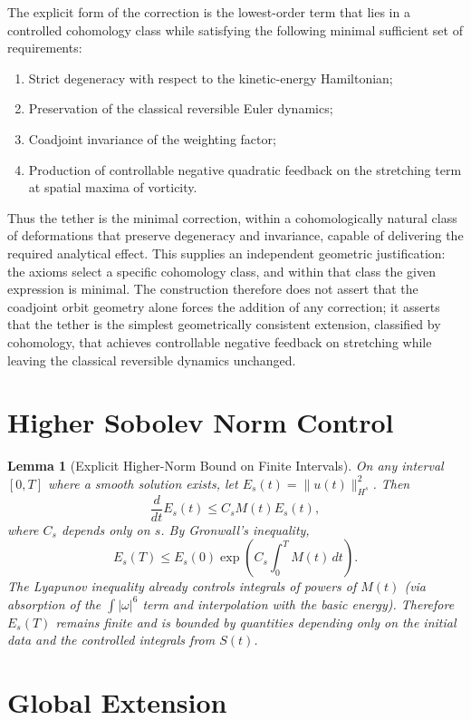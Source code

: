 \documentclass[11pt,a4paper]{article}
\newtheorem{lemma}[theorem]{Lemma}
\begin{document}
The explicit form of the correction is the lowest-order term that lies in a controlled cohomology class while satisfying the following minimal sufficient set of requirements:
\begin{enumerate}
    \item Strict degeneracy with respect to the kinetic-energy Hamiltonian;
    \item Preservation of the classical reversible Euler dynamics;
    \item Coadjoint invariance of the weighting factor;
    \item Production of controllable negative quadratic feedback on the stretching term at spatial maxima of vorticity.
\end{enumerate}

Thus the tether is the minimal correction, within a cohomologically natural class of deformations that preserve degeneracy and invariance, capable of delivering the required analytical effect. This supplies an independent geometric justification: the axioms select a specific cohomology class, and within that class the given expression is minimal. The construction therefore does not assert that the coadjoint orbit geometry alone forces the addition of any correction; it asserts that the tether is the simplest geometrically consistent extension, classified by cohomology, that achieves controllable negative feedback on stretching while leaving the classical reversible dynamics unchanged.

\section{Higher Sobolev Norm Control}

\begin{lemma}[Explicit Higher-Norm Bound on Finite Intervals]
On any interval \([0, T]\) where a smooth solution exists, let \( E_s(t) = \|u(t)\|_{H^s}^2 \). Then
\[
\frac{d}{dt} E_s(t) \leq C_s M(t) E_s(t),
\]
where \( C_s \) depends only on \( s \). By Gronwall’s inequality,
\[
E_s(T) \leq E_s(0) \exp\left( C_s \int_0^T M(t) \, dt \right).
\]
The Lyapunov inequality already controls integrals of powers of \( M(t) \) (via absorption of the \(\int |\omega|^6\) term and interpolation with the basic energy). Therefore \( E_s(T) \) remains finite and is bounded by quantities depending only on the initial data and the controlled integrals from \( S(t) \).
\end{lemma}

\section{Global Extension}
\end{document}
